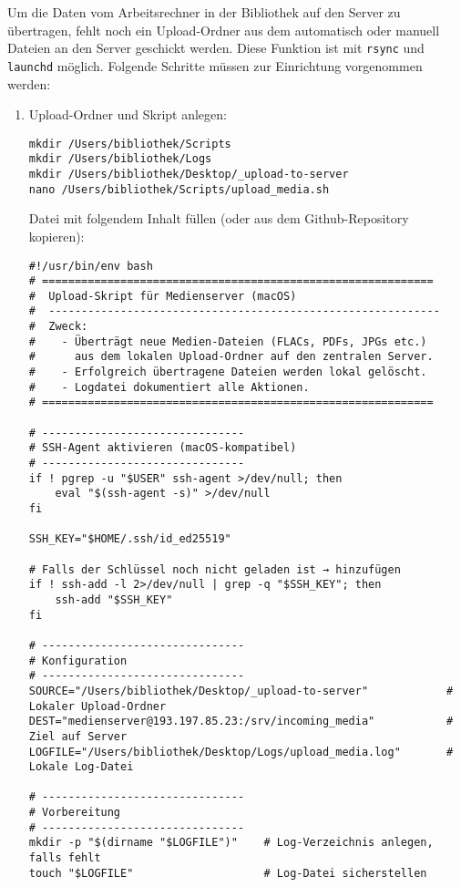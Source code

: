 \documentclass[12pt,a4paper]{report}
\begin{document}
  Um die Daten vom Arbeitsrechner in der Bibliothek auf den Server zu übertragen,
  fehlt noch ein Upload-Ordner aus dem automatisch oder manuell Dateien an den Server geschickt werden.
  Diese Funktion ist mit \texttt{rsync} und \texttt{launchd} möglich. 
  Folgende Schritte müssen zur Einrichtung vorgenommen werden:

  \begin{enumerate}
    \item Upload-Ordner und Skript anlegen:
    \begin{verbatim}
mkdir /Users/bibliothek/Scripts
mkdir /Users/bibliothek/Logs
mkdir /Users/bibliothek/Desktop/_upload-to-server
nano /Users/bibliothek/Scripts/upload_media.sh
    \end{verbatim}

    Datei mit folgendem Inhalt füllen (oder aus dem Github-Repository kopieren):

    \begin{verbatim}
#!/usr/bin/env bash
# ============================================================
#  Upload-Skript für Medienserver (macOS)
#  ------------------------------------------------------------
#  Zweck:
#    - Überträgt neue Medien-Dateien (FLACs, PDFs, JPGs etc.)
#      aus dem lokalen Upload-Ordner auf den zentralen Server.
#    - Erfolgreich übertragene Dateien werden lokal gelöscht.
#    - Logdatei dokumentiert alle Aktionen.
# ============================================================

# -------------------------------
# SSH-Agent aktivieren (macOS-kompatibel)
# -------------------------------
if ! pgrep -u "$USER" ssh-agent >/dev/null; then
    eval "$(ssh-agent -s)" >/dev/null
fi

SSH_KEY="$HOME/.ssh/id_ed25519"

# Falls der Schlüssel noch nicht geladen ist → hinzufügen
if ! ssh-add -l 2>/dev/null | grep -q "$SSH_KEY"; then
    ssh-add "$SSH_KEY"
fi

# -------------------------------
# Konfiguration
# -------------------------------
SOURCE="/Users/bibliothek/Desktop/_upload-to-server"            # Lokaler Upload-Ordner
DEST="medienserver@193.197.85.23:/srv/incoming_media"           # Ziel auf Server
LOGFILE="/Users/bibliothek/Desktop/Logs/upload_media.log"       # Lokale Log-Datei

# -------------------------------
# Vorbereitung
# -------------------------------
mkdir -p "$(dirname "$LOGFILE")"    # Log-Verzeichnis anlegen, falls fehlt
touch "$LOGFILE"                    # Log-Datei sicherstellen


\end{verbatim}
\end{enumerate}
\end{document}
